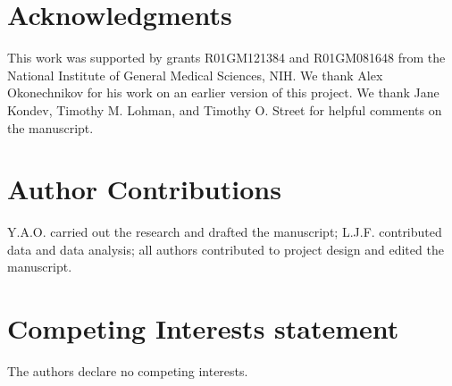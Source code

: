 \section*{Acknowledgments}

This work was supported by grants R01GM121384 and R01GM081648 from the National Institute of General Medical Sciences, NIH. We thank Alex Okonechnikov for his work on an earlier version of this project. We thank Jane Kondev, Timothy M. Lohman, and Timothy O. Street for helpful comments on the manuscript.

\section*{Author Contributions}

Y.A.O. carried out the research and drafted the manuscript; L.J.F. contributed data and data analysis; all authors contributed to project design and edited the manuscript.

\section*{Competing Interests statement}

The authors declare no competing interests.